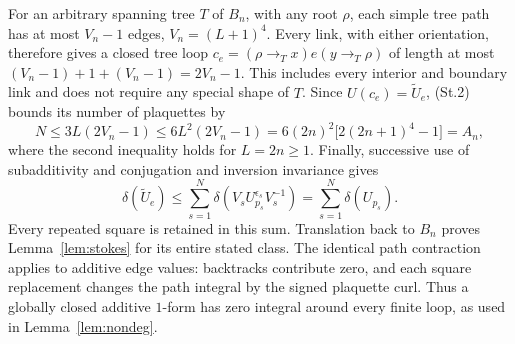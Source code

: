 \documentclass[11pt,a4paper]{article}
\theoremstyle{plain}
\theoremstyle{definition}
\theoremstyle{remark}
\numberwithin{equation}{section}
\begin{document}
For an arbitrary spanning tree $T$ of $B_n$, with any root $\rho$, each simple tree path has at most
$V_n-1$ edges, $V_n=(L+1)^4$.
Every link, with either orientation, therefore gives a closed tree loop
$c_e=(\rho\to_Tx)e(y\to_T\rho)$ of length at most
$(V_n-1)+1+(V_n-1)=2V_n-1$. This includes every interior and boundary link and does not require any special shape of $T$.
Since $U(c_e)=\widetilde U_e$, (St.2) bounds its number of plaquettes by
\[
N\le3L(2V_n-1)\le6L^2(2V_n-1)
=6(2n)^2\bigl[2(2n+1)^4-1\bigr]=A_n,
\]
where the second inequality holds for $L=2n\ge1$.
Finally, successive use of subadditivity and conjugation and inversion invariance gives
\[
\delta(\widetilde U_e)
\le\sum_{s=1}^N\delta(V_sU_{p_s}^{\epsilon_s}V_s^{-1})
=\sum_{s=1}^N\delta(U_{p_s}).
\]
Every repeated square is retained in this sum. Translation back to $B_n$ proves Lemma~\ref{lem:stokes} for its entire stated class.
The identical path contraction applies to additive edge values: backtracks contribute zero, and each square replacement changes
the path integral by the signed plaquette curl. Thus a globally closed additive $1$-form has zero integral around every finite loop,
as used in Lemma~\ref{lem:nondeg}.
\end{document}
